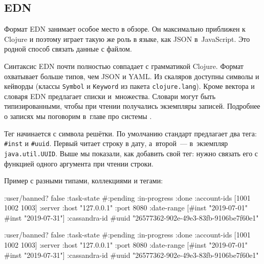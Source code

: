 \subsection{EDN}


Формат EDN занимает особое место в обзоре. Он максимально приближен к Clojure и
поэтому играет такую же роль в языке, как JSON в~JavaScript. Это родной способ
связать данные с файлом.

Синтаксис EDN почти полностью совпадает с грамматикой Clojure. Формат охватывает
больше типов, чем JSON и YAML. Из скаляров доступны символы и кейворды (классы
\verb|Symbol| и \verb|Keyword| из пакета \verb|clojure.lang|). Кроме вектора и
словаря EDN предлагает списки и~множества. Словари могут быть типизированными,
чтобы при чтении получались экземпляры записей. Подробнее о записях мы поговорим
в~главе про системы .


Тег начинается с символа решётки. По умолчанию стандарт предлагает два тега:
\verb|#inst| и \verb|#uuid|. Первый читает строку в дату, а~второй~---
в~экземпляр \verb|java.util.UUID|. Выше мы показали, как добавить свой тег:
нужно связать его с функцией одного аргумента при чтении строки.

Пример с разными типами, коллекциями и тегами:

\ifx\DEVICETYPE\MOBILE

\begin{english}
  \begin{clojure}
{:user/banned? false
 :task-state
 #{:pending :in-progress :done}
 :account-ids
 [1001 1002 1003]
 :server
 {:host "127.0.0.1" :port 8080}
 :date-range
 [#inst "2019-07-01" #inst "2019-07-31"]
 :cassandra-id #uuid
 "26577362-902e-49e3-83fb-9106be7f60e1"}
  \end{clojure}
\end{english}

\else

\begin{english}
  \begin{clojure}
{:user/banned? false
 :task-state #{:pending :in-progress :done}
 :account-ids [1001 1002 1003]
 :server {:host "127.0.0.1" :port 8080}
 :date-range [#inst "2019-07-01" #inst "2019-07-31"]
 :cassandra-id #uuid "26577362-902e-49e3-83fb-9106be7f60e1"}
  \end{clojure}
\end{english}

